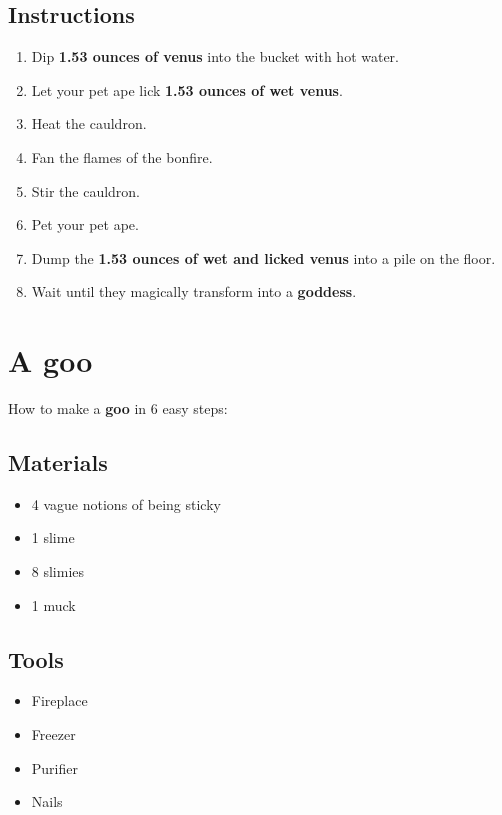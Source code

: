 \documentclass{article}
\begin{document}
\subsection{Instructions}\begin{enumerate}
\item 
Dip \textbf{1.53 ounces of venus} into the bucket with hot water.
\item 
Let your pet ape lick \textbf{1.53 ounces of wet venus}.
\item 
Heat the cauldron.
\item 
Fan the flames of the bonfire.
\item 
Stir the cauldron.
\item 
Pet your pet ape.
\item 
Dump the \textbf{1.53 ounces of wet and licked venus} into a pile on the floor.
\item 
Wait until they magically transform into a \textbf{goddess}.
\end{enumerate}
\newpage
\section{A goo}How to make a \textbf{goo} in 6 easy steps:

\subsection{Materials}\begin{itemize}
\item 
4 vague notions of being sticky
\item 
1 slime
\item 
8 slimies
\item 
1 muck
\end{itemize}
\subsection{Tools}\begin{itemize}
\item 
Fireplace
\item 
Freezer
\item 
Purifier
\item 
Nails
\end{itemize}
\end{document}
